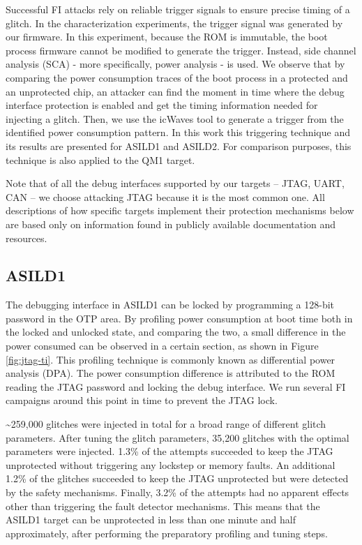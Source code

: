 \documentclass[a4paper, 10pt]{IEEEtran}
\newcommand{\TI}{ASILD1\xspace}
\newcommand{\ST}{ASILD2\xspace}
\newcommand{\NXP}{QM1\xspace}
\begin{document}
Successful FI attacks rely on reliable trigger signals to ensure precise timing of a glitch. In the characterization experiments, the trigger signal was generated by our firmware. In this experiment, because the ROM is immutable, the boot process firmware cannot be modified to generate the trigger. Instead, side channel analysis (SCA) - more specifically, power analysis - is used. 
We observe that by comparing the power consumption traces of the boot process in a protected and an unprotected chip, an attacker can find the moment in time where the debug interface protection is enabled and get the timing information needed for injecting a glitch. Then, we use the icWaves tool to generate a trigger from the identified power consumption pattern. In this work this triggering technique and its results are presented for \TI and \ST. For comparison purposes, this technique is also applied to the \NXP target.


Note that of all the debug interfaces supported by our targets -- JTAG, UART, CAN -- we choose attacking JTAG because it is the most common one. All descriptions of how specific targets implement their protection mechanisms below are based only on information found in publicly available documentation and resources.

\subsection{\TI}

The debugging interface in \TI can be locked by programming a 128-bit password in the OTP area. By profiling power consumption at boot time both in the locked and unlocked state, and comparing the two, a small difference in the power consumed can be observed in a certain section, as shown in Figure \ref{fig:jtag-ti}. This profiling technique is commonly known as differential power analysis (DPA). The power consumption difference is attributed to the ROM reading the JTAG password and locking the debug interface. We run several FI campaigns around this point in time to prevent the JTAG lock.

\textasciitilde259,000 glitches were injected in total for a broad range of different glitch parameters. After tuning the glitch parameters, 35,200 glitches with the optimal parameters were injected. 1.3\% of the attempts succeeded to keep the JTAG unprotected without triggering any lockstep or memory faults. An additional 1.2\% of the glitches succeeded to keep the JTAG unprotected but were detected by the safety mechanisms. Finally, 3.2\% of the attempts had no apparent effects other than triggering the fault detector mechanisms.
This means that the \TI target can be unprotected in less than one minute and half approximately, after performing the preparatory profiling and tuning steps. 
\end{document}
